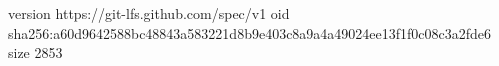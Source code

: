 version https://git-lfs.github.com/spec/v1
oid sha256:a60d9642588bc48843a583221d8b9e403c8a9a4a49024ee13f1f0c08c3a2fde6
size 2853
